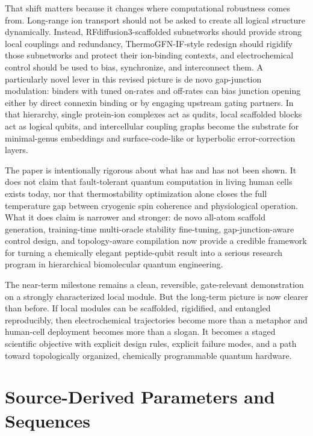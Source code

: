 \documentclass[11pt]{report}
\theoremstyle{definition}
\begin{document}
That shift matters because it changes where computational robustness comes from. Long-range ion transport should not be asked to create all logical structure dynamically. Instead, RFdiffusion3-scaffolded subnetworks should provide strong local couplings and redundancy, ThermoGFN-IF-style redesign should rigidify those subnetworks and protect their ion-binding contexts, and electrochemical control should be used to bias, synchronize, and interconnect them. A particularly novel lever in this revised picture is de novo gap-junction modulation: binders with tuned on-rates and off-rates can bias junction opening either by direct connexin binding or by engaging upstream gating partners. In that hierarchy, single protein-ion complexes act as qudits, local scaffolded blocks act as logical qubits, and intercellular coupling graphs become the substrate for minimal-genus embeddings and surface-code-like or hyperbolic error-correction layers.

The paper is intentionally rigorous about what has and has not been shown. It does not claim that fault-tolerant quantum computation in living human cells exists today, nor that thermostability optimization alone closes the full temperature gap between cryogenic spin coherence and physiological operation. What it does claim is narrower and stronger: de novo all-atom scaffold generation, training-time multi-oracle stability fine-tuning, gap-junction-aware control design, and topology-aware compilation now provide a credible framework for turning a chemically elegant peptide-qubit result into a serious research program in hierarchical biomolecular quantum engineering.

The near-term milestone remains a clean, reversible, gate-relevant demonstration on a strongly characterized local module. But the long-term picture is now clearer than before. If local modules can be scaffolded, rigidified, and entangled reproducibly, then electrochemical trajectories become more than a metaphor and human-cell deployment becomes more than a slogan. It becomes a staged scientific objective with explicit design rules, explicit failure modes, and a path toward topologically organized, chemically programmable quantum hardware.

\appendix

\chapter{Source-Derived Parameters and Sequences}
\end{document}

